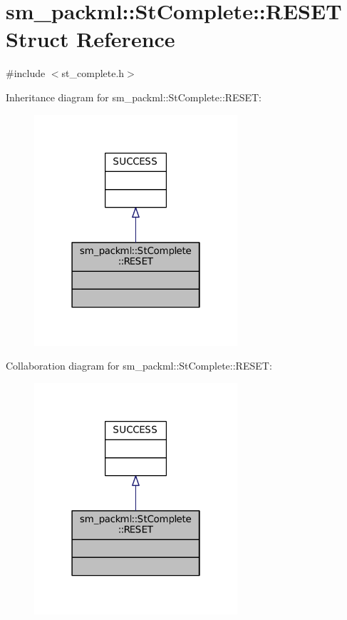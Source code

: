 \hypertarget{structsm__packml_1_1StComplete_1_1RESET}{}\section{sm\+\_\+packml\+:\+:St\+Complete\+:\+:R\+E\+S\+ET Struct Reference}
\label{structsm__packml_1_1StComplete_1_1RESET}


{\ttfamily \#include $<$st\+\_\+complete.\+h$>$}



Inheritance diagram for sm\+\_\+packml\+:\+:St\+Complete\+:\+:R\+E\+S\+ET\+:
\nopagebreak
\begin{figure}[H]
\begin{center}
\leavevmode
\includegraphics[width=214pt]{structsm__packml_1_1StComplete_1_1RESET__inherit__graph}
\end{center}
\end{figure}


Collaboration diagram for sm\+\_\+packml\+:\+:St\+Complete\+:\+:R\+E\+S\+ET\+:
\nopagebreak
\begin{figure}[H]
\begin{center}
\leavevmode
\includegraphics[width=214pt]{structsm__packml_1_1StComplete_1_1RESET__coll__graph}
\end{center}
\end{figure}


